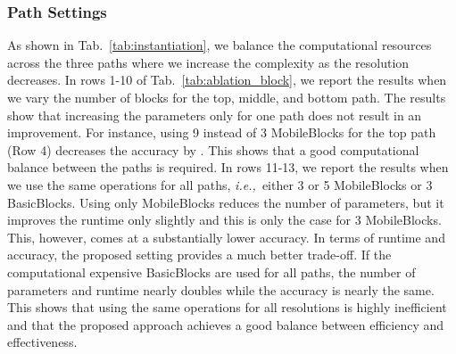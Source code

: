 \documentclass[letterpaper, 10 pt, journal, twoside]{ieeetran}
\newcommand{\tabref}[1]{Tab.~\ref{#1}}
\def\ie{\textit{i.e.,~}}
\begin{document}
\subsubsection{Path Settings}
As shown in \tabref{tab:instantiation}, we balance the computational resources across the three paths where we increase the complexity as the resolution decreases. 
In rows \mbox{1-10} of \tabref{tab:ablation_block}, we report the results when we vary the number of blocks for the top, middle, and bottom path. The results show that increasing the parameters only for one path does not result in an improvement. For instance, using 9 instead of 3 MobileBlocks for the top path (Row 4) decreases the accuracy by . This shows that a good computational balance between the paths is required. In rows 11-13, we report the results when we use the same operations for all paths, \ie either 3 or 5 MobileBlocks or 3 BasicBlocks.
Using only MobileBlocks reduces the number of parameters, but it improves the runtime only slightly and this is only the case for 3 MobileBlocks. This, however, comes at a substantially lower accuracy. 
In terms of runtime and accuracy, the proposed setting provides a much better trade-off. 
If the computational expensive BasicBlocks are used for all paths, the number of parameters and runtime nearly doubles while the accuracy is nearly the same. 
This shows that using the same operations for all resolutions is highly inefficient and that the proposed approach achieves a good balance between efficiency and effectiveness.
\end{document}
